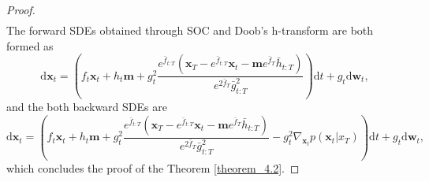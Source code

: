 \begin{proof}
\begin{align}
\end{align}
The forward SDEs obtained through SOC and Doob's h-transform are both formed as 
\begin{equation}
\mathrm{d} \mathbf{x}_t = \left( f_t \mathbf{x}_t + h_t \mathbf{m} + g^2_t \frac{e^{\bar{f}_{t:T}}\left(\mathbf{x}_T - e^{\bar{f}_{t:T}} \mathbf{x}_t - \mathbf{m} e^{\bar{f}_T} \bar{h}_{t:T}\right)}{e^{2\bar{f}_T}\bar{g}^2_{t:T}} \right) \mathrm{d} t + g_t \mathrm{d} \mathbf{w}_t,
\end{equation}
and the both backward SDEs are 
\begin{equation}
\mathrm{d} \mathbf{x}_t = \left( f_t \mathbf{x}_t + h_t \mathbf{m} + g^2_t \frac{e^{\bar{f}_{t:T}}\left(\mathbf{x}_T - e^{\bar{f}_{t:T}} \mathbf{x}_t - \mathbf{m} e^{\bar{f}_T} \bar{h}_{t:T}\right)}{e^{2\bar{f}_T}\bar{g}^2_{t:T}} - g^2_t \nabla_{\mathbf{x}_t} p(\mathbf{x}_t | x_T) \right) \mathrm{d} t + g_t \mathrm{d} \mathbf{w}_t,
\end{equation}
which concludes the proof of the Theorem \ref{theorem_4.2}.


\end{proof}
